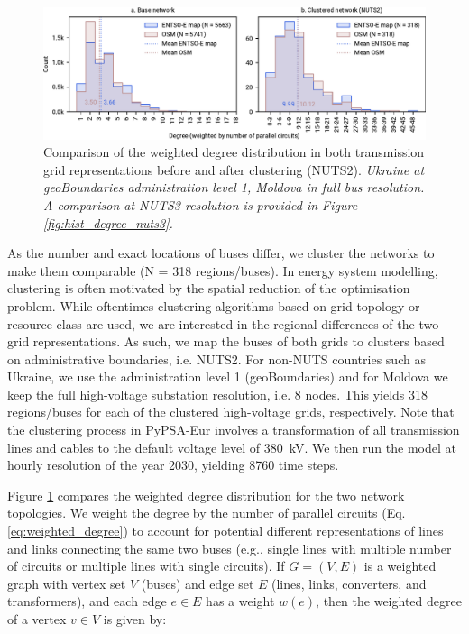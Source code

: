 \documentclass[fleqn,10pt]{wlscirep}
\let\autocite\cite
\begin{document}
\begin{figure}[!htbp]
    \centering
    \includegraphics{figures/fig_hist_degree_nuts2.pdf}
    \caption{Comparison of the weighted degree distribution in both transmission grid representations before and after clustering (NUTS2). \textit{Ukraine at geoBoundaries\autocite{runfolaGeoBoundariesGlobalDatabase2020} administration level 1, Moldova in full bus resolution. A comparison at NUTS3 resolution is provided in Figure \ref{fig:hist_degree_nuts3}.}}
    \label{fig:hist_degree_nuts2}
\end{figure}

As the number and exact locations of buses differ, we cluster the networks to make them comparable (N = 318 regions/buses). In energy system modelling, clustering is often motivated by the spatial reduction of the optimisation problem. While oftentimes clustering algorithms based on grid topology or resource class are used, \autocite{frysztackiComparisonClusteringMethods2022} we are interested in the regional differences of the two grid representations. As such, we map the buses of both grids to clusters based on administrative boundaries, i.e. NUTS2. For non-NUTS countries such as Ukraine, we use the administration level 1 (geoBoundaries\autocite{runfolaGeoBoundariesGlobalDatabase2020}) and for Moldova we keep the full high-voltage substation resolution, i.e. 8 nodes. This yields 318 regions/buses for each of the clustered high-voltage grids, respectively. Note that the clustering process in PyPSA-Eur involves a transformation of all transmission lines and cables to the default voltage level of \SI{380}{\kilo\volt}. We then run the model at hourly resolution of the year 2030, yielding 8760 time steps. 

Figure \ref{fig:hist_degree_nuts2} compares the weighted degree distribution for the two network topologies. We weight the degree by the number of parallel circuits (Eq. \ref{eq:weighted_degree}) to account for potential different representations of lines and links connecting the same two buses (e.g., single lines with multiple number of circuits or multiple lines with single circuits). If \( G = (V, E) \) is a weighted graph with vertex set \( V \) (buses) and edge set \( E \) (lines, links, converters, and transformers), and each edge \( e \in E \) has a weight \( w(e) \), then the weighted degree of a vertex \( v \in V \) is given by:
\end{document}
